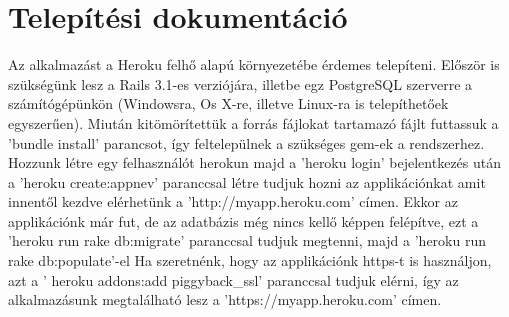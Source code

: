 \chapter{Telepítési dokumentáció}\label{sect:telepites}

Az alkalmazást a Heroku felhő alapú környezetébe érdemes telepíteni. Először is szükségünk lesz a Rails 3.1-es verziójára, illetbe egz PostgreSQL szerverre a számítógépünkön (Windowsra, Os X-re, illetve Linux-ra is telepíthetőek egyszerűen). Miután kitömörítettük a forrás fájlokat tartamazó fájlt futtassuk a 'bundle install' parancsot, így feltelepülnek a szükséges gem-ek a rendszerhez. Hozzunk létre egy felhasználót herokun majd a 'heroku login' bejelentkezés után a 'heroku create:appnev' paranccsal létre tudjuk hozni az applikációnkat amit innentől kezdve elérhetünk a 'http://myapp.heroku.com' címen.
Ekkor az applikációnk már fut, de az adatbázis még nincs kellő képpen felépítve, ezt a 'heroku run rake db:migrate' paranccsal tudjuk megtenni, majd a 'heroku run rake db:populate'-el 
Ha szeretnénk, hogy az applikációnk https-t is használjon, azt a ' heroku addons:add piggyback\_ssl' paranccsal tudjuk elérni, így az alkalmazásunk megtalálható lesz a 'https://myapp.heroku.com' címen.